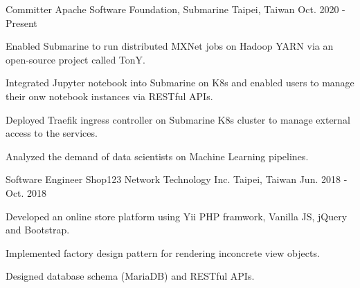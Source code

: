 \begin{cventries}
  \cventry
    {Committer} %
    {Apache Software Foundation, Submarine} %
    {Taipei, Taiwan} %
    {Oct. 2020 - Present} %
    {
      \begin{cvitems} %
        \item {Enabled Submarine to run distributed MXNet jobs on Hadoop YARN via an open-source project called TonY.}
        \item {Integrated Jupyter notebook into Submarine on K8s and enabled users to manage their onw notebook instances via RESTful APIs.}
        \item {Deployed Traefik ingress controller on Submarine K8s cluster to manage external access to the services.}
        \item {Analyzed the demand of data scientists on Machine Learning pipelines.}
      \end{cvitems}
    }

  \cventry
    {Software Engineer} %
    {Shop123 Network Technology Inc.} %
    {Taipei, Taiwan} %
    {Jun. 2018 - Oct. 2018} %
    {
      \begin{cvitems} %
        \item {Developed an online store platform using Yii PHP framwork, Vanilla JS, jQuery and Bootstrap.}
        \item {Implemented factory design pattern for rendering inconcrete view objects.}
        \item {Designed database schema (MariaDB) and RESTful APIs.}
      \end{cvitems}
    }


\end{cventries}
